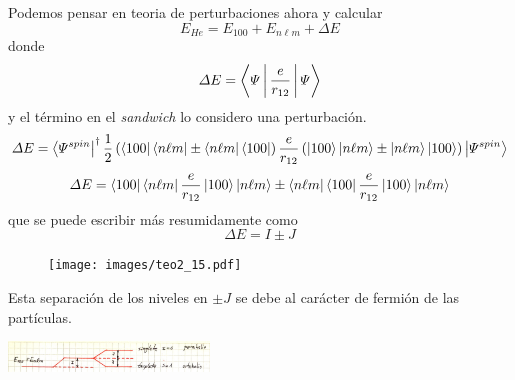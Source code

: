 \documentclass[10pt,oneside]{CBFT_book}
\begin{document}
Podemos pensar en teoria de perturbaciones ahora y calcular 
\[
	E_{He} = E_{100} + E_{n\ell m} + \Delta E
\]
donde 
\[
	\Delta E = \Braket{\Psi|\frac{e}{r_{12}}|\Psi}
\]
y el término en el {\it sandwich} lo considero una perturbación.
\[
	\Delta E = \Bra{\Psi^{spin}}^\dagger \frac{1}{2}\left(\Bra{100}\Bra{n\ell m} \pm \Bra{n\ell m}\Bra{100}
	\right) \frac{e}{r_{12}} \left(\Ket{100}\Ket{n\ell m} \pm \Ket{n\ell m}\Ket{100}\right)\Ket{\Psi^{spin}}
\]
\[
	\Delta E = \Bra{100}\Bra{n\ell m}\frac{e}{r_{12}}\Ket{100}\Ket{n\ell m} \pm  
	\Bra{n\ell m}\Bra{100}\frac{e}{r_{12}}\Ket{100}\Ket{n\ell m}
\]
que se puede escribir más resumidamente como
\[
	\Delta E = I \pm J
\]

\begin{figure}[htb]
	\begin{center}
	\texttt{[image: images/teo2\_15.pdf]}
	\end{center}
	\caption{}
\end{figure} 

Esta separación de los niveles en $\pm J$ se debe al carácter de fermión de las partículas.

\includegraphics[width=0.4\textwidth]{images/fig_ft2_extra_identical2.jpg}
\end{document}
